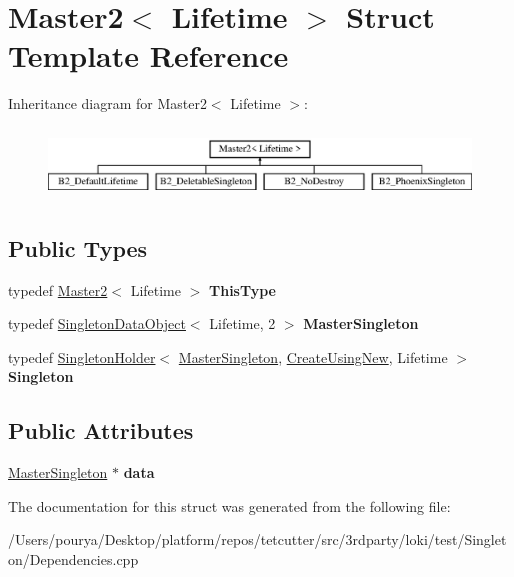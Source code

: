 \hypertarget{structMaster2}{}\section{Master2$<$ Lifetime $>$ Struct Template Reference}
\label{structMaster2}
Inheritance diagram for Master2$<$ Lifetime $>$\+:\begin{figure}[H]
\begin{center}
\leavevmode
\includegraphics[height=1.904762cm]{structMaster2}
\end{center}
\end{figure}
\subsection*{Public Types}
\begin{DoxyCompactItemize}
\item 
\hypertarget{structMaster2_a60efeab88264a4e127e97b1084219c27}{}typedef \hyperlink{structMaster2}{Master2}$<$ Lifetime $>$ {\bfseries This\+Type}\label{structMaster2_a60efeab88264a4e127e97b1084219c27}

\item 
\hypertarget{structMaster2_a190f95e35aed83672e0a5ea9b1e4c446}{}typedef \hyperlink{structSingletonDataObject}{Singleton\+Data\+Object}$<$ Lifetime, 2 $>$ {\bfseries Master\+Singleton}\label{structMaster2_a190f95e35aed83672e0a5ea9b1e4c446}

\item 
\hypertarget{structMaster2_ac8856ccd653414bb74810b219e462452}{}typedef \hyperlink{classLoki_1_1SingletonHolder}{Singleton\+Holder}$<$ \hyperlink{structSingletonDataObject}{Master\+Singleton}, \hyperlink{structLoki_1_1CreateUsingNew}{Create\+Using\+New}, Lifetime $>$ {\bfseries Singleton}\label{structMaster2_ac8856ccd653414bb74810b219e462452}

\end{DoxyCompactItemize}
\subsection*{Public Attributes}
\begin{DoxyCompactItemize}
\item 
\hypertarget{structMaster2_a0f5376ffe9cfa67bbf926dde5719f176}{}\hyperlink{structSingletonDataObject}{Master\+Singleton} $\ast$ {\bfseries data}\label{structMaster2_a0f5376ffe9cfa67bbf926dde5719f176}

\end{DoxyCompactItemize}


The documentation for this struct was generated from the following file\+:\begin{DoxyCompactItemize}
\item 
/\+Users/pourya/\+Desktop/platform/repos/tetcutter/src/3rdparty/loki/test/\+Singleton/Dependencies.\+cpp\end{DoxyCompactItemize}
